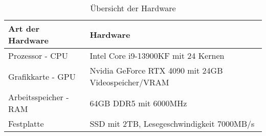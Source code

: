 \begin{table}[!htb]
\centering
\begin{tabular}{|l|l|}
\hline
\rowcolor[HTML]{CBCEFB} 
{\color[HTML]{000000} Art der Hardware} & {\color[HTML]{000000} Hardware}                       \\ \hline
Prozessor - CPU                           & Intel Core i9-13900KF mit 24 Kernen                 \\ \hline
Grafikkarte - GPU                         & Nvidia GeForce RTX 4090 mit 24GB Videospeicher/VRAM \\ \hline
Arbeitsspeicher - RAM                     & 64GB DDR5 mit 6000MHz                               \\ \hline
Festplatte                                & SSD mit 2TB, Lesegeschwindigkeit 7000MB/s           \\ \hline
\end{tabular}
\caption{Übersicht der Hardware}
\label{tab:hardware}
\end{table}